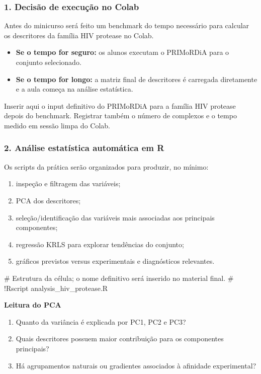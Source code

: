 \documentclass[a4paper,11pt]{refart}
\begin{document}
\subsubsection{1. Decisão de execução no Colab}

Antes do minicurso será feito um benchmark do tempo necessário para calcular os descritores da família HIV protease no Colab.

\begin{itemize}
    \item \textbf{Se o tempo for seguro:} os alunos executam o PRIMoRDiA para o conjunto selecionado.
    \item \textbf{Se o tempo for longo:} a matriz final de descritores é carregada diretamente e a aula começa na análise estatística.
\end{itemize}

\begin{todobox}
Inserir aqui o input definitivo do PRIMoRDiA para a família HIV protease depois do benchmark. Registrar também o número de complexos e o tempo medido em sessão limpa do Colab.
\end{todobox}

\subsubsection{2. Análise estatística automática em R}

Os scripts da prática serão organizados para produzir, no mínimo:

\begin{enumerate}
    \item inspeção e filtragem das variáveis;
    \item PCA dos descritores;
    \item seleção/identificação das variáveis mais associadas aos principais componentes;
    \item regressão KRLS para explorar tendências do conjunto;
    \item gráficos previstos versus experimentais e diagnósticos relevantes.
\end{enumerate}

\begin{shell}
# Estrutura da célula; o nome definitivo será inserido no material final.
# !Rscript analysis_hiv_protease.R
\end{shell}

\begin{interpretacaobox}
\textbf{Leitura do PCA}
\begin{enumerate}
    \item Quanto da variância é explicada por PC1, PC2 e PC3?
    \item Quais descritores possuem maior contribuição para os componentes principais?
    \item Há agrupamentos naturais ou gradientes associados à afinidade experimental?
\end{enumerate}
\end{interpretacaobox}
\end{document}
